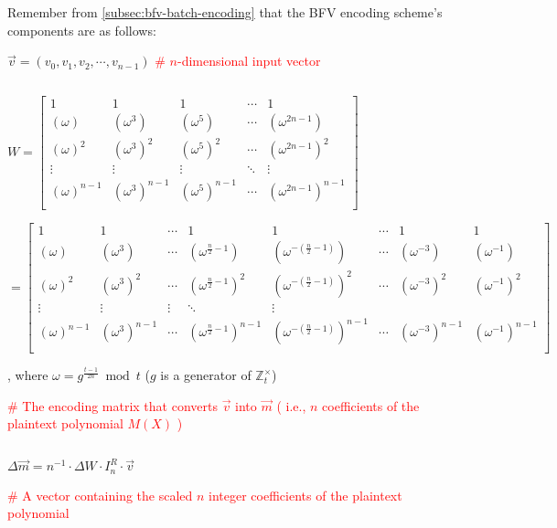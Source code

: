 $ $

Remember from \autoref{subsec:bfv-batch-encoding} that the BFV encoding scheme's components are as follows:

$\vec{v} = (v_0, v_1, v_2, \cdots, v_{n-1})$ \textcolor{red}{\text{ } \# $n$-dimensional input vector}

$ $

$W =  \begin{bmatrix}
1 & 1 & 1 & \cdots & 1\\
(\omega) & (\omega^3) & (\omega^5) & \cdots & (\omega^{2n-1})\\
(\omega)^2 & (\omega^3)^2 & (\omega^5)^2 & \cdots & (\omega^{2n-1})^2\\
\vdots & \vdots & \vdots & \ddots & \vdots \\
(\omega)^{n-1} & (\omega^3)^{n-1} & (\omega^5)^{n-1} & \cdots & (\omega^{2n-1})^{n-1}\\
\end{bmatrix}$

$= \begin{bmatrix}
1 & 1 & \cdots & 1 & 1 & \cdots & 1 & 1\\
(\omega) & (\omega^3) & \cdots & (\omega^{\frac{n}{2} - 1}) & (\omega^{-(\frac{n}{2} - 1)}) & \cdots & (\omega^{-3}) & (\omega^{-1})\\
(\omega)^2 & (\omega^3)^2 & \cdots & (\omega^{\frac{n}{2} - 1})^2 & (\omega^{-(\frac{n}{2} - 1)})^2 & \cdots & (\omega^{-3})^2 & (\omega^{-1})^2\\
\vdots & \vdots & \vdots & \ddots & \vdots \\
(\omega)^{n-1} & (\omega^3)^{n-1} & \cdots & (\omega^{\frac{n}{2} - 1})^{n-1} & (\omega^{-(\frac{n}{2} - 1)})^{n-1} & \cdots & (\omega^{-3})^{n-1} & (\omega^{-1})^{n-1}\\
\end{bmatrix}$

, where $\omega = g^{\frac{t - 1}{2n}} \bmod t$ ($g$ is a generator of $\mathbb{Z}_t^{\times}$)

\textcolor{red}{\# The encoding matrix that converts $\vec{v}$ into $\vec{m}$ ( i.e., $n$ coefficients of the plaintext polynomial $M(X)$ )}
 


$ $

$\Delta\vec{m}  = n^{-1}\cdot\Delta W\cdot I_n^R\cdot\vec{v}$  

\textcolor{red}{\text{ } \# A vector containing the  scaled $n$ integer coefficients of the plaintext polynomial}

$ $

